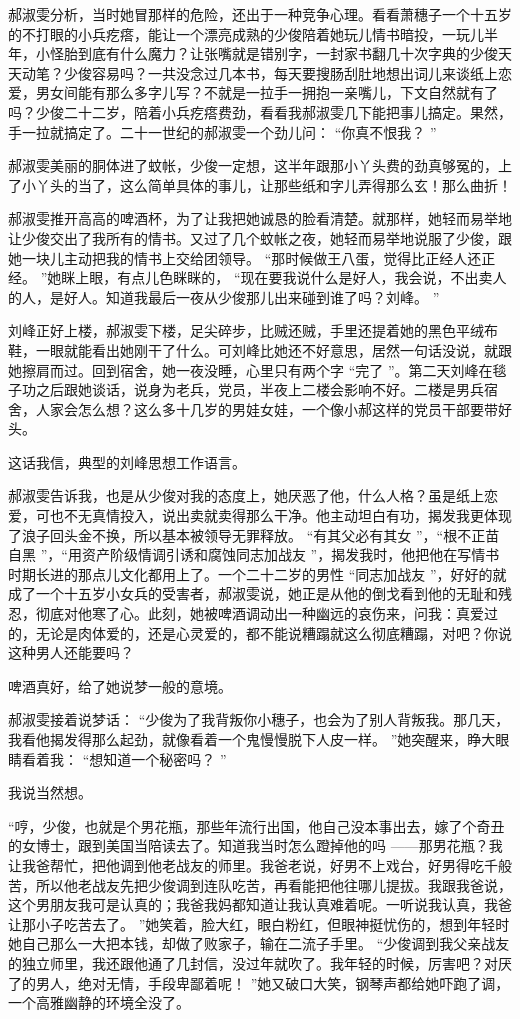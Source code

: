 \documentclass[12pt,twoside,openany]{book}
\begin{document}
郝淑雯分析，当时她冒那样的危险，还出于一种竞争心理。看看萧穗子一个十五岁的不打眼的小兵疙瘩，能让一个漂亮成熟的少俊陪着她玩儿情书暗投，一玩儿半年，小怪胎到底有什么魔力？让张嘴就是错别字，一封家书翻几十次字典的少俊天天动笔？少俊容易吗？一共没念过几本书，每天要搜肠刮肚地想出词儿来谈纸上恋爱，男女间能有那么多字儿写？不就是一拉手一拥抱一亲嘴儿，下文自然就有了吗？少俊二十二岁，陪着小兵疙瘩费劲，看看我郝淑雯几下能把事儿搞定。果然，手一拉就搞定了。二十一世纪的郝淑雯一个劲儿问： “你真不恨我？ ”

郝淑雯美丽的胴体进了蚊帐，少俊一定想，这半年跟那小丫头费的劲真够冤的，上了小丫头的当了，这么简单具体的事儿，让那些纸和字儿弄得那么玄！那么曲折！

郝淑雯推开高高的啤酒杯，为了让我把她诚恳的脸看清楚。就那样，她轻而易举地让少俊交出了我所有的情书。又过了几个蚊帐之夜，她轻而易举地说服了少俊，跟她一块儿主动把我的情书上交给团领导。 “那时候做王八蛋，觉得比正经人还正经。 ”她眯上眼，有点儿色眯眯的， “现在要我说什么是好人，我会说，不出卖人的人，是好人。知道我最后一夜从少俊那儿出来碰到谁了吗？刘峰。 ”

刘峰正好上楼，郝淑雯下楼，足尖碎步，比贼还贼，手里还提着她的黑色平绒布鞋，一眼就能看出她刚干了什么。可刘峰比她还不好意思，居然一句话没说，就跟她擦肩而过。回到宿舍，她一夜没睡，心里只有两个字 “完了 ”。第二天刘峰在毯子功之后跟她谈话，说身为老兵，党员，半夜上二楼会影响不好。二楼是男兵宿舍，人家会怎么想？这么多十几岁的男娃女娃，一个像小郝这样的党员干部要带好头。

这话我信，典型的刘峰思想工作语言。

郝淑雯告诉我，也是从少俊对我的态度上，她厌恶了他，什么人格？虽是纸上恋爱，可也不无真情投入，说出卖就卖得那么干净。他主动坦白有功，揭发我更体现了浪子回头金不换，所以基本被领导无罪释放。 “有其父必有其女 ”，“根不正苗自黑 ”，“用资产阶级情调引诱和腐蚀同志加战友 ”，揭发我时，他把他在写情书时期长进的那点儿文化都用上了。一个二十二岁的男性 “同志加战友 ”，好好的就成了一个十五岁小女兵的受害者，郝淑雯说，她正是从他的倒戈看到他的无耻和残忍，彻底对他寒了心。此刻，她被啤酒调动出一种幽远的哀伤来，问我：真爱过的，无论是肉体爱的，还是心灵爱的，都不能说糟蹋就这么彻底糟蹋，对吧？你说这种男人还能要吗？

啤酒真好，给了她说梦一般的意境。

郝淑雯接着说梦话： “少俊为了我背叛你小穗子，也会为了别人背叛我。那几天，我看他揭发得那么起劲，就像看着一个鬼慢慢脱下人皮一样。 ”她突醒来，睁大眼睛看着我： “想知道一个秘密吗？ ”

我说当然想。

“哼，少俊，也就是个男花瓶，那些年流行出国，他自己没本事出去，嫁了个奇丑的女博士，跟到美国当陪读去了。知道我当时怎么蹬掉他的吗 ——那男花瓶？我让我爸帮忙，把他调到他老战友的师里。我爸老说，好男不上戏台，好男得吃千般苦，所以他老战友先把少俊调到连队吃苦，再看能把他往哪儿提拔。我跟我爸说，这个男朋友我可是认真的；我爸我妈都知道让我认真难着呢。一听说我认真，我爸让那小子吃苦去了。 ”她笑着，脸大红，眼白粉红，但眼神挺忧伤的，想到年轻时她自己那么一大把本钱，却做了败家子，输在二流子手里。 “少俊调到我父亲战友的独立师里，我还跟他通了几封信，没过年就吹了。我年轻的时候，厉害吧？对厌了的男人，绝对无情，手段卑鄙着呢！ ”她又破口大笑，钢琴声都给她吓跑了调，一个高雅幽静的环境全没了。
\end{document}
